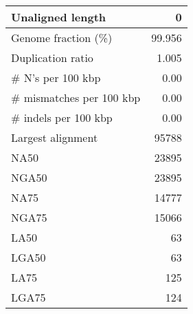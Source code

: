 \documentclass[12pt,a4paper]{article}
\begin{document}
\begin{table}[ht]
\begin{center}
\begin{tabular}{|l*{1}{|r}|}
Unaligned length & 0 \\ \hline
Genome fraction (\%) & 99.956 \\ \hline
Duplication ratio & 1.005 \\ \hline
\# N's per 100 kbp & 0.00 \\ \hline
\# mismatches per 100 kbp & 0.00 \\ \hline
\# indels per 100 kbp & 0.00 \\ \hline
Largest alignment & 95788 \\ \hline
NA50 & 23895 \\ \hline
NGA50 & 23895 \\ \hline
NA75 & 14777 \\ \hline
NGA75 & 15066 \\ \hline
LA50 & 63 \\ \hline
LGA50 & 63 \\ \hline
LA75 & 125 \\ \hline
LGA75 & 124 \\ \hline
\end{tabular}
\end{center}
\end{table}
\end{document}
